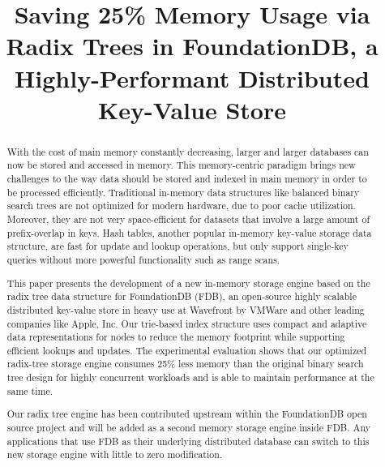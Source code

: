 \documentclass[sigplan,screen,nonacm]{acmart}
\begin{document}
\title{Saving 25\% Memory Usage via Radix Trees in FoundationDB, a Highly-Performant Distributed Key-Value Store}

\begin{abstract}
With the cost of main memory constantly decreasing, larger and larger databases can now be stored and accessed in memory. This memory-centric paradigm brings new challenges to the way data should be stored and indexed in main memory in order to be processed efficiently. Traditional in-memory data structures like balanced binary search trees are not optimized for modern hardware, due to poor cache utilization. Moreover, they are not very space-efficient for datasets that involve a large amount of prefix-overlap in keys. Hash tables, another popular in-memory key-value storage data structure, are fast for update and lookup operations, but only support single-key queries without more powerful functionality such as range scans. 

This paper presents the development of a new in-memory storage engine based on the radix tree data structure for FoundationDB (FDB), an open-source highly scalable distributed key-value store in heavy use at Wavefront by VMWare and other leading companies like Apple, Inc.  Our trie-based index structure uses compact and adaptive data representations for nodes to reduce the memory footprint while supporting efficient lookups and updates. The experimental evaluation shows that our optimized radix-tree storage engine consumes 25\% less memory than the original binary search tree design for highly concurrent workloads and is able to maintain performance at the same time. 

Our radix tree engine has been contributed upstream within the FoundationDB open source project and will be added as a second memory storage engine inside FDB. Any applications that use FDB as their underlying distributed database can switch to this new storage engine with little to zero modification.
 
\end{abstract}

\end{document}
